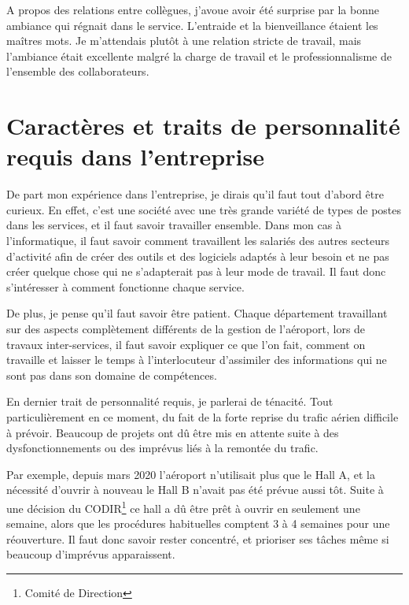A propos des relations entre collègues, j’avoue avoir été surprise par la bonne ambiance qui régnait dans le service. L’entraide et la bienveillance étaient les maîtres mots. Je m’attendais plutôt à une relation stricte de travail, mais l’ambiance était excellente malgré la charge de travail et le professionnalisme de l’ensemble des collaborateurs.


\section{Caractères et traits de personnalité requis dans l'entreprise}

De part mon expérience dans l'entreprise, je dirais qu'il faut tout d'abord être curieux. En effet, c'est une société avec une très grande variété de types de postes dans les services, et il faut savoir travailler ensemble.
Dans mon cas à l'informatique, il faut savoir comment travaillent les salariés des autres secteurs d'activité afin de créer des outils et des logiciels adaptés à leur besoin et ne pas créer quelque chose qui ne s'adapterait pas à leur mode de travail.
Il faut donc s'intéresser à comment fonctionne chaque service.\newline

De plus, je pense qu'il faut savoir être patient. Chaque département travaillant sur des aspects complètement différents de la gestion de l'aéroport, lors de travaux inter-services, il faut savoir expliquer ce que l'on fait, comment on travaille et laisser le temps à l'interlocuteur d'assimiler des informations qui ne sont pas dans son domaine de compétences.\newline

En dernier trait de personnalité requis, je parlerai de ténacité. Tout particulièrement en ce moment, du fait de la forte reprise du trafic aérien difficile à prévoir. Beaucoup de projets ont dû être mis en attente suite à des dysfonctionnements ou des imprévus liés à la remontée du trafic.

Par exemple, depuis mars 2020 l’aéroport n’utilisait plus que le Hall A, et la nécessité d’ouvrir à nouveau le Hall B n’avait pas été prévue aussi tôt. Suite à une décision du CODIR\footnote{Comité de Direction} ce hall a dû être prêt à ouvrir en seulement une semaine, alors que les procédures habituelles comptent 3 à 4 semaines pour une réouverture. Il faut donc savoir rester concentré, et prioriser ses tâches même si beaucoup d'imprévus apparaissent.

\newpage

